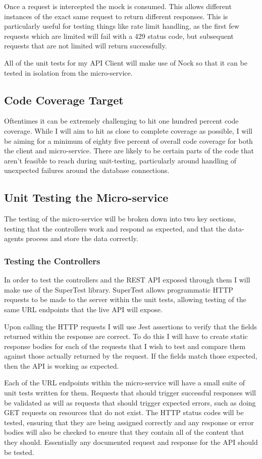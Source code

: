 Once a request is intercepted the mock is consumed. This allows different instances of the exact same request to return different responses. This is particularly useful for testing things like rate limit handling, as the first few requests which are limited will fail with a 429 status code, but subsequent requests that are not limited will return successfully.

All of the unit tests for my API Client will make use of Nock so that it can be tested in isolation from the micro-service.
\subsection{Code Coverage Target}
Oftentimes it can be extremely challenging to hit one hundred percent code coverage. While I will aim to hit as close to complete coverage as possible, I will be aiming for a minimum of eighty five percent of overall code coverage for both the client and micro-service. There are likely to be certain parts of the code that aren't feasible to reach during unit-testing, particularly around handling of unexpected failures around the database connections.
\subsection{Unit Testing the Micro-service}
The testing of the micro-service will be broken down into two key sections, testing that the controllers work and respond as expected, and that the data-agents process and store the data correctly.
\subsubsection{Testing the Controllers}
In order to test the controllers and the REST API exposed through them I will make use of the SuperTest library. SuperTest allows programmatic HTTP requests to be made to the server within the unit tests, allowing testing of the same URL endpoints that the live API will expose.

Upon calling the HTTP requests I will use Jest assertions to verify that the fields returned within the response are correct. To do this I will have to create static response bodies for each of the requests that I wish to test and compare them against those actually returned by the request. If the fields match those expected, then the API is working as expected.

Each of the URL endpoints within the micro-service will have a small suite of unit tests written for them. Requests that should trigger successful responses will be validated as will as requests that should trigger expected errors, such as doing GET requests on resources that do not exist. The HTTP status codes will be tested, ensuring that they are being assigned correctly and any response or error bodies will also be checked to ensure that they contain all of the content that they should. Essentially any documented request and response for the API should be tested.
